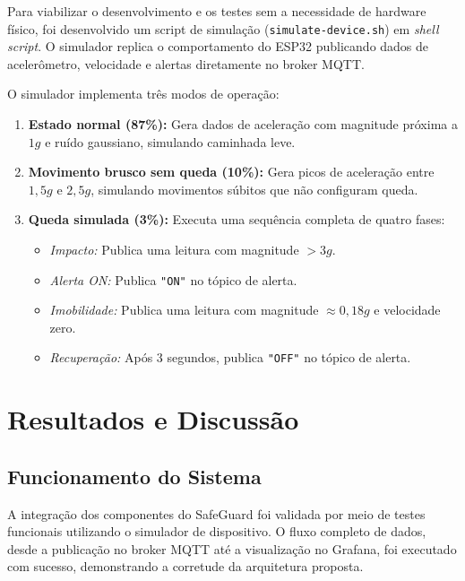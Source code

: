 \documentclass[a4paper,12pt]{article}
\begin{document}
Para viabilizar o desenvolvimento e os testes sem a necessidade de hardware físico, foi desenvolvido um script de simulação (\texttt{simulate-device.sh}) em \textit{shell script}. O simulador replica o comportamento do ESP32 publicando dados de acelerômetro, velocidade e alertas diretamente no broker MQTT.

O simulador implementa três modos de operação:

\begin{enumerate}[leftmargin=2cm]
    \item \textbf{Estado normal (87\%):} Gera dados de aceleração com magnitude próxima a $1g$ e ruído gaussiano, simulando caminhada leve.
    \item \textbf{Movimento brusco sem queda (10\%):} Gera picos de aceleração entre $1{,}5g$ e $2{,}5g$, simulando movimentos súbitos que não configuram queda.
    \item \textbf{Queda simulada (3\%):} Executa uma sequência completa de quatro fases:
    \begin{itemize}
        \item \textit{Impacto:} Publica uma leitura com magnitude $> 3g$.
        \item \textit{Alerta ON:} Publica \texttt{"ON"} no tópico de alerta.
        \item \textit{Imobilidade:} Publica uma leitura com magnitude $\approx 0{,}18g$ e velocidade zero.
        \item \textit{Recuperação:} Após 3 segundos, publica \texttt{"OFF"} no tópico de alerta.
    \end{itemize}
\end{enumerate}

\section{Resultados e Discussão}

\subsection{Funcionamento do Sistema}

A integração dos componentes do SafeGuard foi validada por meio de testes funcionais utilizando o simulador de dispositivo. O fluxo completo de dados, desde a publicação no broker MQTT até a visualização no Grafana, foi executado com sucesso, demonstrando a corretude da arquitetura proposta.
\end{document}

